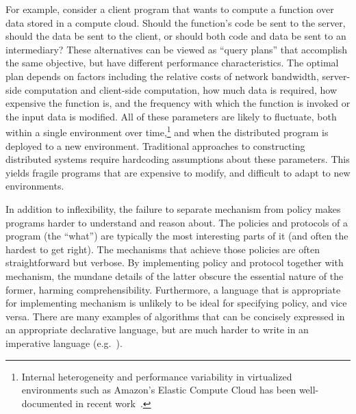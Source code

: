 \documentclass{article}
\begin{document}
For example, consider a client program that wants to compute a
function over data stored in a compute cloud. Should the function's
code be sent to the server, should the data be sent to the client, or
should both code and data be sent to an intermediary? These
alternatives can be viewed as ``query plans'' that accomplish the same
objective, but have different performance characteristics. The optimal
plan depends on factors including the relative costs of network
bandwidth, server-side computation and client-side computation, how
much data is required, how expensive the function is, and the
frequency with which the function is invoked or the input data is
modified. All of these parameters are likely to fluctuate, both within
a single environment over time,\footnote{Internal heterogeneity and
  performance variability in virtualized environments such as Amazon's
  Elastic Compute Cloud has been well-documented in recent
  work~\cite{late-sched}.} and when the distributed program is
deployed to a new environment. Traditional approaches to constructing
distributed systems require hardcoding assumptions about these
parameters. This yields fragile programs that are expensive to modify,
and difficult to adapt to new environments.

In addition to inflexibility, the failure to separate mechanism from
policy makes programs harder to understand and reason about. The
policies and protocols of a program (the ``what'') are typically the
most interesting parts of it (and often the hardest to get right). The
mechanisms that achieve those policies are often straightforward but
verbose. By implementing policy and protocol together with mechanism,
the mundane details of the latter obscure the essential nature of the
former, harming comprehensibility. Furthermore, a language that is
appropriate for implementing mechanism is unlikely to be ideal for
specifying policy, and vice versa. There are many examples of
algorithms that can be concisely expressed in an appropriate
declarative language, but are much harder to write in an imperative
language (e.g.\ \cite{chord-overlog}).
\end{document}
